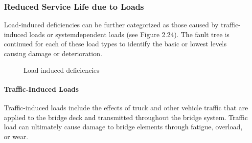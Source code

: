 \subsubsection{Reduced Service Life due to Loads}

Load-induced deficiencies can be further categorized as those caused by traffic-induced loads or systemdependent loads (see Figure 2.24). The fault tree is continued for each of these load types to identify the basic or lowest levels causing damage or deterioration.

\begin{figure}
  \caption{Load-induced deficiencies}\label{fig:load-induced-deficiencies}
\end{figure}

\paragraph{Traffic-Induced Loads}

Traffic-induced loads include the effects of truck and other vehicle traffic that are applied to the bridge deck and transmitted throughout the bridge system. Traffic load can ultimately cause damage to bridge elements through
fatigue, overload, or wear.

